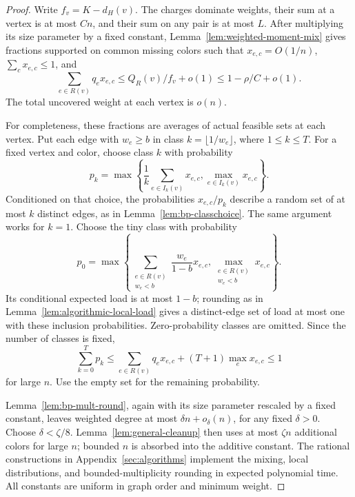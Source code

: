 \documentclass[11pt]{article}
\theoremstyle{definition}\newtheorem{algorithm}{Algorithm}[section]
\numberwithin{equation}{section}
\theoremstyle{remark}\newtheorem*{remark}{Remark}
\begin{document}
\begin{proof}
Write $f_v=K-d_H(v)$. The charges dominate weights, their sum at a
vertex is at most $Cn$, and their sum on any pair is at most $L$.
After multiplying its size parameter by a fixed constant,
Lemma~\ref{lem:weighted-moment-mix} gives fractions supported on
common missing colors such that $x_{e,c}=O(1/n)$,
$\sum_cx_{e,c}\le1$, and
\[
 \sum_{e\in R(v)}q_ex_{e,c}
 \le Q_R(v)/f_v+o(1)\le1-\rho/C+o(1).
\]
The total uncovered weight at each vertex is $o(n)$.

For completeness, these fractions are averages of actual feasible
sets at each vertex. Put each edge with $w_e\ge b$ in class
$k=\lfloor1/w_e\rfloor$, where $1\le k\le T$. For a fixed vertex
and color, choose class $k$ with probability
\[
 p_k=\max\left\{\frac1k\sum_{e\in I_k(v)}x_{e,c},
                       \max_{e\in I_k(v)}x_{e,c}\right\}.
\]
Conditioned on that choice, the probabilities $x_{e,c}/p_k$ describe
a random set of at most $k$ distinct edges, as in
Lemma~\ref{lem:bp-classchoice}. The same argument works for $k=1$.
Choose the tiny class with probability
\[
 p_0=\max\left\{\sum_{\substack{e\in R(v)\\w_e<b}}
                 \frac{w_e}{1-b}x_{e,c},
                 \max_{\substack{e\in R(v)\\w_e<b}}x_{e,c}\right\}.
\]
Its conditional expected load is at most $1-b$; rounding as in
Lemma~\ref{lem:algorithmic-local-load} gives a distinct-edge set of
load at most one with these inclusion probabilities. Zero-probability
classes are omitted. Since the number of classes is fixed,
\[
 \sum_{k=0}^T p_k
 \le\sum_{e\in R(v)}q_ex_{e,c}+(T+1)\max_e x_{e,c}\le1
\]
for large $n$. Use the empty set for the remaining probability.

Lemma~\ref{lem:bp-mult-round}, again with its size parameter rescaled
by a fixed constant, leaves weighted degree at most
$\delta n+o_\delta(n)$, for any fixed $\delta>0$. Choose
$\delta<\zeta/8$. Lemma~\ref{lem:general-cleanup} then uses at most
$\zeta n$ additional colors for large $n$; bounded $n$ is absorbed
into the additive constant. The rational constructions in
Appendix~\ref{sec:algorithms} implement the mixing, local distributions,
and bounded-multiplicity rounding in expected polynomial time.
All constants are uniform in graph order and minimum weight.
\end{proof}
\end{document}
